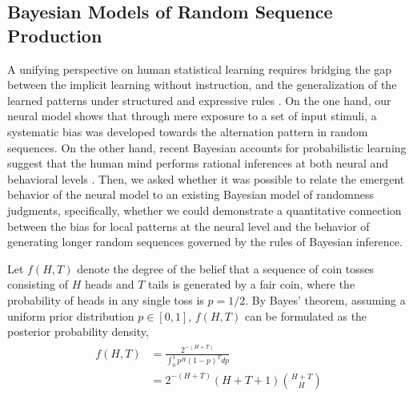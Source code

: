 \documentclass{pnastwo}
\begin{document}
\begin{article}
\section{Bayesian Models of Random Sequence Production}
A unifying perspective on human statistical learning requires bridging the gap between the implicit learning without instruction, and the generalization of the learned patterns under structured and expressive rules \cite{Aslin2012}.
On the one hand, our neural model shows that through mere exposure to a set of input stimuli, a systematic bias was developed towards the alternation pattern in random sequences.
On the other hand, recent Bayesian accounts for probabilistic learning suggest that the human mind performs rational inferences at both neural and behavioral levels \cite{Pouget2013,Tenenbaum2011}.
Then, we asked whether it was possible to relate the emergent behavior of the neural model to an existing Bayesian model of randomness judgments,
specifically, whether we could demonstrate a quantitative connection between the bias for local patterns at the neural level and the behavior of generating longer random sequences governed by the rules of Bayesian inference.

Let $f(H,T)$ denote the degree of the belief that a sequence of coin tosses consisting of $H$ heads and $T$ tails is generated by a fair coin, where the probability of heads in any single toss is $p = 1/2$.
By Bayes' theorem, assuming a uniform prior distribution $p \in [0,1]$, $f(H,T)$ can be formulated as the posterior probability density,
\begin{align}\label{eq:bayesian-fair-coin}
\begin{split}
  f(H,T) &= \frac{2^{-(H+T)}}{\int_0^1 p^H (1-p)^T dp} \\
    &= 2^{-(H+T)} (H+T+1) \binom{H+T}{H}
\end{split}
\end{align}


\end{article}
\end{document}
